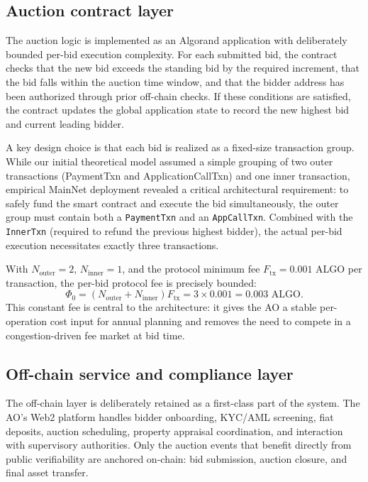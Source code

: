 \documentclass[runningheads]{llncs}
\begin{document}
\subsection{Auction contract layer}

The auction logic is implemented as an Algorand application with deliberately
bounded per-bid execution complexity. For each submitted bid, the contract
checks that the new bid exceeds the standing bid by the required increment, that
the bid falls within the auction time window, and that the bidder address has
been authorized through prior off-chain checks. If these conditions are satisfied,
the contract updates the global application state to record the new highest bid
and current leading bidder.

A key design choice is that each bid is realized as a fixed-size transaction group. While our initial theoretical model assumed a simple grouping of two outer transactions (PaymentTxn and ApplicationCallTxn) and one inner transaction, empirical MainNet deployment revealed a critical architectural requirement: to safely fund the smart contract and execute the bid simultaneously, the outer group must contain both a \texttt{PaymentTxn} and an \texttt{AppCallTxn}. Combined with the \texttt{InnerTxn} (required to refund the previous highest bidder), the actual per-bid execution necessitates exactly three transactions.

With $N_{\text{outer}} = 2$, $N_{\text{inner}} = 1$, and the protocol minimum fee $F_{\text{tx}} = 0.001$ ALGO per transaction, the per-bid protocol fee is precisely bounded:
\begin{equation}
\Phi_0 = (N_{\text{outer}} + N_{\text{inner}})F_{\text{tx}} = 3 \times 0.001 = 0.003 \text{ ALGO}.
\end{equation}
This constant fee is central to the architecture: it gives the AO a stable
per-operation cost input for annual planning and removes the need to compete in
a congestion-driven fee market at bid time.

\subsection{Off-chain service and compliance layer}

The off-chain layer is deliberately retained as a first-class part of the system.
The AO's Web2 platform handles bidder onboarding, KYC/AML screening, fiat
deposits, auction scheduling, property appraisal coordination, and interaction
with supervisory authorities. Only the auction events that benefit directly from
public verifiability are anchored on-chain: bid submission, auction closure, and
final asset transfer.
\end{document}
